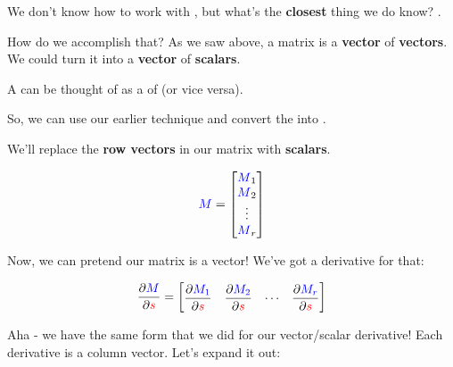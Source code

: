         
        
        We don't know how to work with , but what's the \textbf{closest} thing we do know? .
        
        How do we accomplish that? As we saw above, a matrix is a \textbf{vector} of \textbf{vectors}. We could turn it into a \textbf{vector} of \textbf{scalars}.\\
        
        \begin{concept}
            A  can be thought of as a  of  (or vice versa).
            
            So, we can use our earlier technique and convert the  into .
        \end{concept}
        
        We'll replace the \textbf{row vectors} in our matrix with \textbf{scalars}. 
        
        \begin{equation}
            \textcolor{blue}{M}
            =
            \begin{bmatrix}
                \textcolor{blue}{M}_1 \\ \textcolor{blue}{M}_2 \\ \vdots \\ \textcolor{blue}{M}_r
            \end{bmatrix}
        \end{equation}
    
        Now, we can pretend our matrix is a vector! We've got a derivative for that:
        
        \begin{equation}
            \frac{\partial  \textcolor{blue}{M} }{\partial  \textcolor{red}{s} } 
            =
            \begin{bmatrix}
                \dfrac{\partial  \textcolor{blue}{M_1} }{\partial  \textcolor{red}{s} } &
                \dfrac{\partial  \textcolor{blue}{M_2} }{\partial  \textcolor{red}{s} } &
                \cdots &
                \dfrac{\partial  \textcolor{blue}{M_r} }{\partial  \textcolor{red}{s} } 
            \end{bmatrix}
        \end{equation}
        
        Aha - we have the same form that we did for our vector/scalar derivative! Each derivative is a column vector. Let's expand it out:
        
